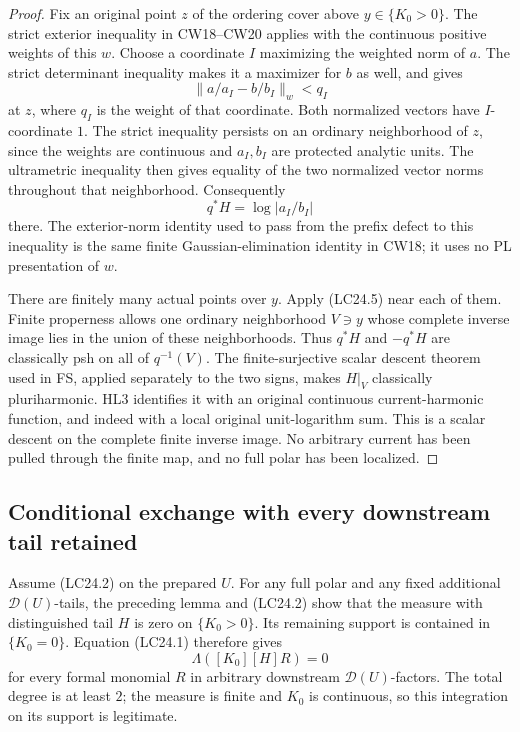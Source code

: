 \begin{proof}
Fix an original point \(z\) of the ordering cover above
\(y\in\{K_0>0\}\). The strict exterior inequality in CW18--CW20
applies with the continuous positive weights of this \(w\).
Choose a coordinate \(I\) maximizing the weighted norm of \(a\).
The strict determinant inequality makes it a maximizer for \(b\)
as well, and gives
\[
          \|a/a_I-b/b_I\|_w<q_I
\]
at \(z\), where \(q_I\) is the weight of that coordinate.
Both normalized vectors have \(I\)-coordinate \(1\).
The strict inequality persists on an ordinary neighborhood of
\(z\), since the weights are continuous and \(a_I,b_I\) are
protected analytic units. The ultrametric inequality then gives
equality of the two normalized vector norms throughout that
neighborhood. Consequently
\[
                          q^*H=\log|a_I/b_I|               \tag{LC24.5}
\]
there. The exterior-norm identity used to pass from the prefix
defect to this inequality is the same finite Gaussian-elimination
identity in CW18; it uses no PL presentation of \(w\).

There are finitely many actual points over \(y\). Apply (LC24.5)
near each of them. Finite properness allows one ordinary
neighborhood \(V\ni y\) whose complete inverse image lies in
the union of these neighborhoods. Thus \(q^*H\) and
\(-q^*H\) are classically psh on all of \(q^{-1}(V)\).
The finite-surjective scalar descent theorem used in FS, applied
separately to the two signs, makes \(H|_V\) classically
pluriharmonic. HL3 identifies it with an original continuous
current-harmonic function, and indeed with a local original
unit-logarithm sum. This is a scalar descent on the complete
finite inverse image. No arbitrary current has been pulled
through the finite map, and no full polar has been localized.
\end{proof}

\subsection{Conditional exchange with every downstream tail retained}

Assume (LC24.2) on the prepared \(U\). For any full polar and
any fixed additional \(\mathcal D(U)\)-tails, the preceding
lemma and (LC24.2) show that the measure with distinguished tail
\(H\) is zero on \(\{K_0>0\}\).
Its remaining support is contained in \(\{K_0=0\}\).
Equation (LC24.1) therefore gives
\[
                 \Lambda([K_0][H]R)=0                    \tag{LC24.6}
\]
for every formal monomial \(R\) in arbitrary downstream
\(\mathcal D(U)\)-factors. The total degree is at least \(2\);
the measure is finite and \(K_0\) is continuous, so this
integration on its support is legitimate.

